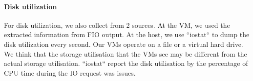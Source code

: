 \documentclass{acmsig}
\begin{document}




\paragraph{Disk utilization}
For disk utilization, we also collect from 2 sources. At the VM, we used the extracted information from FIO output. At the host, we use ``iostat`` to dump the disk utilization every second. Our VMs operate on a file or a virtual hard drive. We think that the storage utilisation that the VMs see may be different from the actual storage utilisation. ``iostat`` report the disk utilisation by the percentage of CPU time during the IO request was issues.
\end{document}
